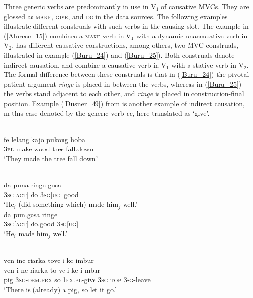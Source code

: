 Three generic verbs are predominantly in use in V$_1$ of causative MVCs. They are glossed as \textsc{make}, \textsc{give}, and \textsc{do} in the data sources. The following examples illustrate different construals with such verbs in the causing slot. The  example in (\ref{Alorese_15}) combines a \textsc{make} verb in V$_1$ with a dynamic unaccusative verb in V$_2$.  has different causative constructions, among others, two MVC construals, illustrated in example (\ref{Buru_24}) and (\ref{Buru_25}). Both construals denote indirect causation, and combine a causative verb in V$_1$ with a stative verb in V$_2$. The formal difference between these construals is that in (\ref{Buru_24}) the pivotal patient argument \textit{ringe} is placed in-between the verbs, whereas in (\ref{Buru_25}) the verbs stand adjacent to each other, and \textit{ringe} is placed in construction-final position. Example (\ref{Dusner_49}) from  is another example of indirect causation, in this case denoted by the generic verb \textit{ve}, here translated as `give'. 

\ea \label{Alorese_15}
\\
\gll fe lelang kajo pukong hoba \\
3\textsc{pl} make wood tree fall.down \\
\glft `They made the tree fall down.'\\ 
\z

\ea
{}\\
\ea \label{Buru_24}
\gll da puna ringe gosa \\
3\textsc{sg}[\textsc{act}] do 3\textsc{sg}[\textsc{ug}] good \\
\glft `He$_i$ (did something which) made him$_j$ well.' \\ 
\ex \label{Buru_25}
\gll da pun.gosa ringe \\ 
3\textsc{sg}[\textsc{act}] do.good 3\textsc{sg}[\textsc{ug}] \\
\glft `He$_i$ made him$_j$ well.'\\ 
\z
\z

\ea \label{Dusner_49}
\\
\glll ven ine riarka tove i ke imbur \\
ven i-ne riarka to-ve i ke i-mbur \\
pig 3\textsc{sg}-\textsc{dem}.\textsc{prx} so 1\textsc{ex}.\textsc{pl}-give 3\textsc{sg} \textsc{top} 3\textsc{sg}-leave \\
\glft `There is (already) a pig, so let it go.'\\
\z

